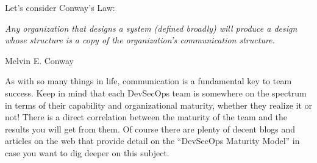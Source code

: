 \justifying
Let's consider Conway's Law:

\begin{displayquote}
    \emph{Any organization that designs a system (defined broadly) will produce a design whose structure is a copy of the
organization's communication structure.}

Melvin E. Conway
\end{displayquote}

\justifying
As with so many things in life, communication is a fundamental key to team success. Keep in mind that each DevSecOps
team is somewhere on the spectrum in terms of their capability and organizational maturity, whether they realize it or not!
There is a direct correlation between the maturity of the team and the results you will get from them. Of course there are
plenty of decent blogs and articles on the web that provide detail on the ``DevSecOps Maturity Model'' in case you want to
dig deeper on this subject.
